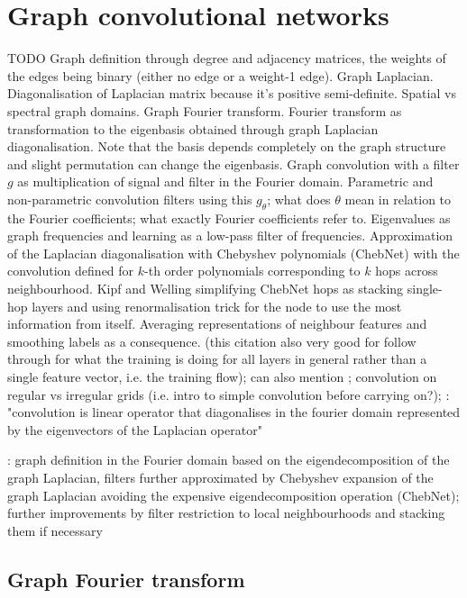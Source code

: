 \section{Graph convolutional networks}
\label{training-gcn}
TODO Graph definition through degree and adjacency matrices, the weights of the edges being binary (either no edge or a weight-1 edge). Graph Laplacian. Diagonalisation of Laplacian matrix because it's positive semi-definite. Spatial vs spectral graph domains. Graph Fourier transform. Fourier transform as transformation to the eigenbasis obtained through graph Laplacian diagonalisation. Note that the basis depends completely on the graph structure and slight permutation can change the eigenbasis. Graph convolution with a filter $g$ as multiplication of signal and filter in the Fourier domain. Parametric and non-parametric convolution filters using this $g_\theta$; what does $\theta$ mean in relation to the Fourier coefficients; what exactly Fourier coefficients refer to. Eigenvalues as graph frequencies and learning as a low-pass filter of frequencies. Approximation of the Laplacian diagonalisation with Chebyshev polynomials (ChebNet) with the convolution defined for $k$-th order polynomials corresponding to $k$ hops across neighbourhood. \cite{defferrard2016convolutional} Kipf and Welling simplifying ChebNet hops as stacking single-hop layers and using renormalisation trick for the node to use the most information from itself. \cite{kipf2017semi} Averaging representations of neighbour features and smoothing labels as a consequence. \cite{wu2019simplifying} (this citation also very good for follow through for what the training is doing for all layers in general rather than a single feature vector, i.e. the training flow); can also mention \cite{wu2019comprehensive}; convolution on regular vs irregular grids (i.e. intro to simple convolution before carrying on?); \cite{defferrard2016convolutional}: "convolution is linear operator that diagonalises in the fourier domain represented by the eigenvectors of the Laplacian operator"




\cite{velickovic2018graph}: graph definition in the Fourier domain based on the eigendecomposition of the graph Laplacian, filters further approximated by Chebyshev expansion of the graph Laplacian avoiding the expensive eigendecomposition operation (ChebNet); further improvements by filter restriction to local neighbourhoods and stacking them if necessary 

\subsection{Graph Fourier transform}


